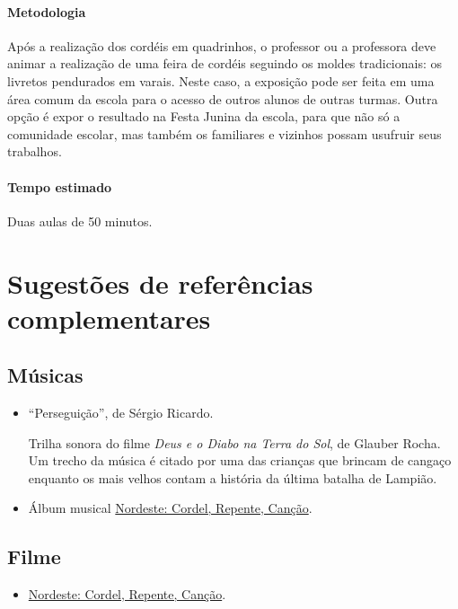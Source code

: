 \documentclass[11pt]{extarticle}
\begin{document}
\paragraph{Metodologia} Após a realização dos cordéis em quadrinhos,
 o professor ou a professora deve animar a realização de uma feira de cordéis 
  seguindo os moldes tradicionais: os livretos pendurados em varais.
 Neste caso, a exposição pode ser feita em uma área comum da escola para o acesso de outros alunos
 de outras turmas. Outra opção é expor o resultado na Festa Junina da escola, para que não só a comunidade
 escolar, mas também os familiares e vizinhos possam usufruir seus trabalhos.


\paragraph{Tempo estimado} Duas aulas de 50 minutos.
 



\section{Sugestões de referências complementares}

\subsection{Músicas} 

\begin{itemize}
	\item ``Perseguição'', de Sérgio Ricardo. 

Trilha sonora do filme \textit{Deus e o Diabo na Terra do Sol}, de Glauber Rocha. 
Um trecho da música é citado por uma das crianças que brincam de cangaço enquanto os mais velhos contam a história
da última batalha de Lampião.

	\item Álbum musical \href{https://www.youtube.com/watch?v=wS6jzcZcc6U}{Nordeste: Cordel, Repente, Canção}. 
\end{itemize}

\subsection{Filme} 
\begin{itemize}

\item \href{https://www.youtube.com/watch?v=xFOZxwBcUmo}{Nordeste: Cordel, Repente, Canção}.

\end{itemize}
\end{document}
